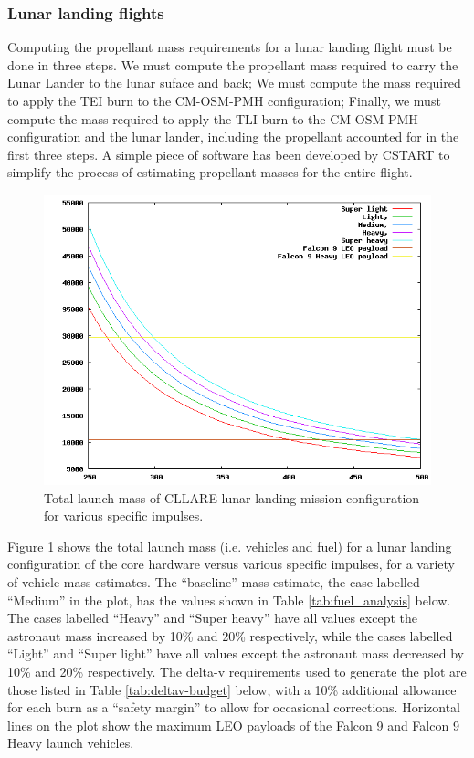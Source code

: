 \documentclass{report}
\begin{document}
\subsubsection{Lunar landing flights}

Computing the propellant mass requirements for a lunar landing flight must be done in three steps.  We must compute the propellant mass required to carry the Lunar Lander to the lunar suface and back; We must compute the mass required to apply the TEI burn to the CM-OSM-PMH configuration; Finally, we must compute the mass required to apply the TLI burn to the CM-OSM-PMH configuration and the lunar lander, including the propellant accounted for in the first three steps.  A simple piece of software has been developed by CSTART to simplify the process of estimating propellant masses for the entire flight.

\begin{figure}[h] \label{fig:fuel_analysis}
\includegraphics[scale=0.6]{images/fuel_analysis}
\caption{Total launch mass of CLLARE lunar landing mission configuration for various specific impulses.}
\end{figure}

Figure \ref{fig:fuel_analysis} shows the total launch mass (i.e. vehicles and fuel) for a lunar landing configuration of the core hardware versus various specific impulses, for a variety of vehicle mass estimates.  The ``baseline'' mass estimate, the case labelled ``Medium'' in the plot, has the values shown in Table \ref{tab:fuel_analysis} below.  The cases labelled ``Heavy'' and ``Super heavy'' have all values except the astronaut mass increased by 10\% and 20\% respectively, while the cases labelled ``Light'' and ``Super light'' have all values except the astronaut mass decreased by 10\% and 20\% respectively.  The delta-v requirements used to generate the plot are those listed in Table \ref{tab:deltav-budget} below, with a 10\% additional allowance for each burn as a ``safety margin'' to allow for occasional corrections.  Horizontal lines on the plot show the maximum LEO payloads of the Falcon 9 and Falcon 9 Heavy launch vehicles.
\end{document}
